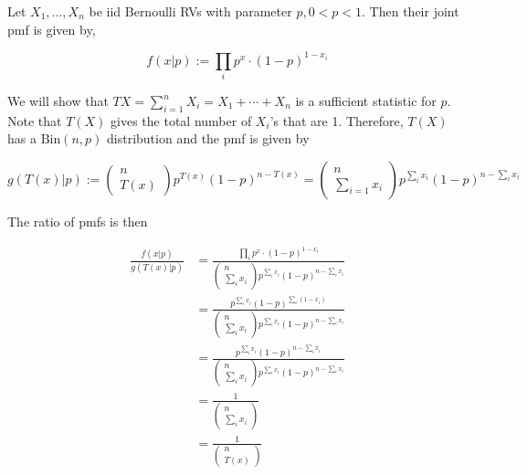 \documentclass[ 11pt,%
				a4paper,%
				twoside,%
				headinclude,%
				footinclude = true,%
				cleardoublepage = empty,%
				reqno]{scrbook}
\begin{document}
\begin{example}
  Let $X_{1}, \ldots, X_{n}$ be iid Bernoulli RVs with parameter $p, 0<p<1$. Then their joint pmf is given by,

  \[
    f({x} | p) := \prod_i p^{x} \cdot(1-p)^{1-x_{i}}
  \]


  We will show that $T{X}=\sum_{i=1}^{n} X_i = X_{1}+\cdots+X_{n}$ is a sufficient statistic for $p$. Note that $T({X})$ gives the total number of $X_{i}$'s that are 1. Therefore, $T({X})$ has a $\text{Bin}(n, p)$ distribution and the pmf is given by

  \[
    g(T({x}) | p) := \left(\begin{array}{c}
n \\
T(x)
\end{array}\right) p^{T(x)}(1-p)^{n-T(x)}
  = \left(\begin{array}{c}
n \\
\sum_{i=1} x_i
\end{array}\right) p^{\sum_i x_i}(1-p)^{n-\sum_i x_i}
  \]

The ratio of pmfs  is then

\[
\begin{aligned}
\frac{f({x} | p)}{g(T({x}) | p)} &=\frac{\prod_i p^{x} \cdot(1-p)^{1-x_{i}}}{\left(\begin{array}{c}
n \\
\sum_i x_i
\end{array}\right) p^{\sum_i x_i}(1-p)^{n-\sum_i x_i}} \\
&=\frac{p^{\sum_i x_{i}}(1-p)^{\sum_i \left(1-x_{i}\right)}}{\left(\begin{array}{c}
n \\
\sum_i x_i
\end{array}\right) p^{\sum_i x_i}(1-p)^{n-\sum_i x_i}} \\
&=\frac{p^{\sum_i x_i}(1-p)^{n-\sum_i x_i}}{\left(\begin{array}{c}
n \\
\sum_i x_i
\end{array}\right) p^{\sum_i x_i}(1-p)^{n-\sum_i x_i}} \\
&=\frac{1}{\left(\begin{array}{c}
n \\
\sum_i x_i
\end{array}\right)} \\
&=\frac{1}{\left(\begin{array}{c}
n \\
T(x)
\end{array}\right)}
\end{aligned}
\]

\end{example}
\end{document}
